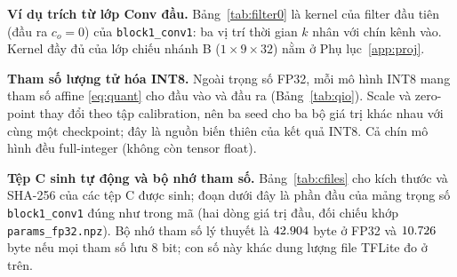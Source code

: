 \documentclass[12pt,a4paper]{article}
\newcommand{\code}[1]{\texttt{#1}}
\begin{document}
\textbf{Ví dụ trích từ lớp Conv đầu.} Bảng~\ref{tab:filter0} là kernel của filter đầu tiên (đầu ra $c_o=0$) của \code{block1\_conv1}: ba vị trí thời gian $k$ nhân với chín kênh vào. Kernel đầy đủ của lớp chiếu nhánh B ($1\times9\times32$) nằm ở Phụ lục~\ref{app:proj}.

\begin{table}[t]
\centering\scriptsize

\caption{Kernel $W_{k,c_i,0}$ của filter 0 trong \code{block1\_conv1} (hình dạng $3\times9$).}
\label{tab:filter0}
\end{table}

\textbf{Tham số lượng tử hóa INT8.} Ngoài trọng số FP32, mỗi mô hình INT8 mang tham số affine \eqref{eq:quant} cho đầu vào và đầu ra (Bảng~\ref{tab:qio}). Scale và zero-point thay đổi theo tập calibration, nên ba seed cho ba bộ giá trị khác nhau với cùng một checkpoint; đây là nguồn biến thiên của kết quả INT8. Cả chín mô hình đều full-integer (không còn tensor float).

\begin{table}[t]
\centering\scriptsize
{}
\caption{Scale và zero-point của đầu vào/đầu ra các mô hình INT8 (nguồn: \code{models/model\_metadata.json}).}
\label{tab:qio}
\end{table}

\textbf{Tệp C sinh tự động và bộ nhớ tham số.} Bảng~\ref{tab:cfiles} cho kích thước và SHA-256 của các tệp C được sinh; đoạn dưới đây là phần đầu của mảng trọng số \code{block1\_conv1} đúng như trong mã (hai dòng giá trị đầu, đối chiếu khớp \code{params\_fp32.npz}). Bộ nhớ tham số lý thuyết là $\mbox{42.904}$ byte ở FP32 và $\mbox{10.726}$ byte nếu mọi tham số lưu 8 bit; con số này khác dung lượng file TFLite đo ở trên.

\begin{table}[t]
\centering\scriptsize
{}
\caption{Tệp C sinh tự động bởi \code{export-c} (nguồn: \code{models/params\_manifest.json}).}
\label{tab:cfiles}
\end{table}


\end{document}
